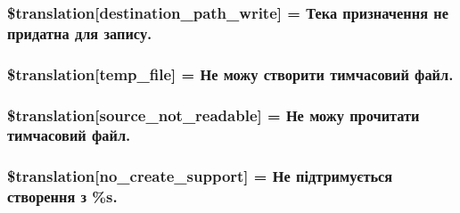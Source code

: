 \subsubsection[{\$translation}]{\setlength{\rightskip}{0pt plus 5cm}\$translation\mbox{[}\textquotesingle{}destination\+\_\+path\+\_\+write\textquotesingle{}\mbox{]} = \textquotesingle{}Тека призначення не придатна для запису.\textquotesingle{}}\label{class_8upload_8uk___u_a_8php_a40e4e1962226b89fd76da5819a9602b0}
\hypertarget{class_8upload_8uk___u_a_8php_a2baece8da11e20d45175db91851ec3e3}{}
\subsubsection[{\$translation}]{\setlength{\rightskip}{0pt plus 5cm}\$translation\mbox{[}\textquotesingle{}temp\+\_\+file\textquotesingle{}\mbox{]} = \textquotesingle{}Не можу створити тимчасовий файл.\textquotesingle{}}\label{class_8upload_8uk___u_a_8php_a2baece8da11e20d45175db91851ec3e3}
\hypertarget{class_8upload_8uk___u_a_8php_a922967ca2df0efdd455261142d8e5715}{}
\subsubsection[{\$translation}]{\setlength{\rightskip}{0pt plus 5cm}\$translation\mbox{[}\textquotesingle{}source\+\_\+not\+\_\+readable\textquotesingle{}\mbox{]} = \textquotesingle{}Не можу прочитати тимчасовий файл.\textquotesingle{}}\label{class_8upload_8uk___u_a_8php_a922967ca2df0efdd455261142d8e5715}
\hypertarget{class_8upload_8uk___u_a_8php_a346dfd1ade29f583dd20d345c436859f}{}
\subsubsection[{\$translation}]{\setlength{\rightskip}{0pt plus 5cm}\$translation\mbox{[}\textquotesingle{}no\+\_\+create\+\_\+support\textquotesingle{}\mbox{]} = \textquotesingle{}Не підтримується створення з \%s.\textquotesingle{}}\label{class_8upload_8uk___u_a_8php_a346dfd1ade29f583dd20d345c436859f}
\hypertarget{class_8upload_8uk___u_a_8php_a53013ce9255c4e1849098ddd9fdb2b3f}{}
